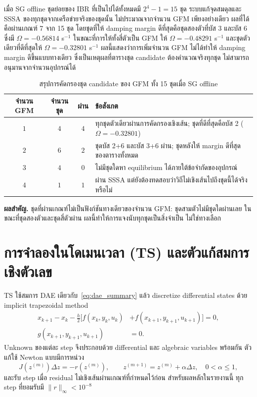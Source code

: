 \documentclass[12pt,a4paper]{article}
\newcommand{\tablefont}{\fontsize{15}{17.2}\selectfont}
\newcommand{\tableheader}{\bfseries}
\newcommand{\resultbox}[1]{\par\addvspace{0.25em}\noindent\textbf{ผลสำคัญ.} #1\par\addvspace{0.25em}}
\begin{document}
เมื่อ SG offline ชุดย่อยของ IBR ที่เป็นไปได้ทั้งหมดมี $2^4-1=15$ ชุด ระบบแก้จุดสมดุลและ SSSA ของทุกชุดจากเครือข่ายจริงของชุดนั้น ไม่ประมาณจากจำนวน GFM เพียงอย่างเดียว ผลที่ได้คือผ่านเกณฑ์ 7 จาก 15 ชุด โดยชุดที่ให้ damping margin ดีที่สุดคือชุดสองตัวที่บัส 3 และบัส 6 ซึ่งมี $\Omega=-0.56814$ s$^{-1}$ ในขณะที่การให้ทั้งสี่ตัวเป็น GFM ให้ $\Omega=-0.48291$ s$^{-1}$ และชุดตัวเดียวที่ดีที่สุดให้ $\Omega=-0.32801$ s$^{-1}$ ผลนี้แสดงว่าการเพิ่มจำนวน GFM ไม่ได้ทำให้ damping margin ดีขึ้นแบบทางเดียว ซึ่งเป็นเหตุผลที่ตารางชุด candidate ต้องคำนวณจริงทุกชุด ไม่สามารถอนุมานจากจำนวนอุปกรณ์ได้

\begin{table}[H]
\begin{center}
\tablefont
\caption{สรุปการคัดกรองชุด candidate ของ GFM ทั้ง 15 ชุดเมื่อ SG offline}
\label{tab:candidate}
\begin{tabularx}{0.99\textwidth}{@{}c c c L@{}}
\toprule
\tableheader จำนวน GFM & จำนวนชุด & ผ่าน & ข้อสังเกต \\
\midrule
$1$ & $4$ & $4$ & ทุกชุดตัวเดียวผ่านการคัดกรองเชิงเส้น; ชุดที่ดีที่สุดคือบัส 2 ($\Omega=-0.32801$) \\
$2$ & $6$ & $2$ & ชุดบัส 2+6 และบัส 3+6 ผ่าน; ชุดหลังให้ margin ดีที่สุดของตารางทั้งหมด \\
$3$ & $4$ & $0$ & ไม่มีชุดใดหา equilibrium ได้ภายใต้ข้อจำกัดของอุปกรณ์ \\
$4$ & $1$ & $1$ & ผ่าน SSSA แต่ยังต้องทดสอบว่าวิถีไม่เชิงเส้นไปถึงชุดนี้ได้จริงหรือไม่ \\
\bottomrule
\end{tabularx}
\end{center}
\end{table}
\resultbox{ชุดที่ผ่านเกณฑ์ไม่เป็นฟังก์ชันทางเดียวของจำนวน GFM: ชุดสามตัวไม่มีชุดใดผ่านเลย ในขณะที่ชุดสองตัวและชุดสี่ตัวผ่าน ผลนี้ทำให้การแจงนับทุกชุดเป็นสิ่งจำเป็น ไม่ใช่ทางเลือก}

\section{การจำลองในโดเมนเวลา (TS) และตัวแก้สมการเชิงตัวเลข}
TS ใช้สมการ DAE เดียวกับ~\eqref{eq:dae_summary} แล้ว discretize differential states ด้วย implicit trapezoidal method
\begin{equation}
\begin{aligned}
x_{k+1}-x_k-\frac{h}{2}\bigl[f(x_k,y_k,u_k)&+f(x_{k+1},y_{k+1},u_{k+1})\bigr]=0,\\
g(x_{k+1},y_{k+1},u_{k+1})&=0.
\end{aligned}
\label{eq:trap_summary}
\end{equation}
Unknown ของแต่ละ step จึงประกอบด้วย differential และ algebraic variables พร้อมกัน ตัวแก้ใช้ Newton แบบมีการหน่วง
\begin{equation}
J(z^{(m)})\Delta z=-r(z^{(m)}),\qquad
z^{(m+1)}=z^{(m)}+\alpha\Delta z,\quad 0<\alpha\le1,
\end{equation}
และรับ step เมื่อ residual ไม่เชิงเส้นผ่านเกณฑ์ที่กำหนดไว้ก่อน สำหรับผลหลักในรายงานนี้ ทุก step ที่ยอมรับมี $\|r\|_{\infty}<10^{-8}$
\end{document}

